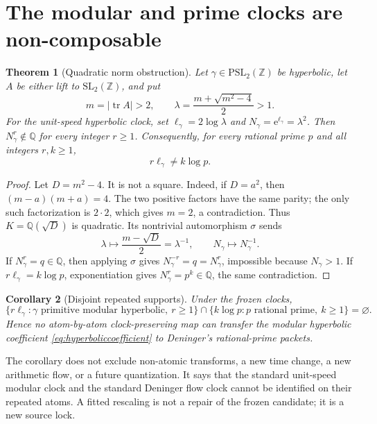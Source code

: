 \documentclass[11pt]{article}
\newtheorem{theorem}{Theorem}
\newtheorem{corollary}[theorem]{Corollary}
\theoremstyle{definition}
\theoremstyle{remark}
\newcommand{\Q}{\mathbb{Q}}
\newcommand{\Z}{\mathbb{Z}}
\newcommand{\e}{\mathrm{e}}
\begin{document}
\section{The modular and prime clocks are non-composable}
\label{sec:clock}

\begin{theorem}[Quadratic norm obstruction]
\label{thm:clock}
Let \(\gamma\in\mathrm{PSL}_2(\Z)\) be hyperbolic, let \(A\) be either lift
to \(\mathrm{SL}_2(\Z)\), and put
\[
 m=|\operatorname{tr}A|>2,\qquad
 \lambda=\frac{m+\sqrt{m^2-4}}{2}>1.
\]
For the unit-speed hyperbolic clock, set
\(\ell_\gamma=2\log\lambda\) and
\(N_\gamma=\e^{\ell_\gamma}=\lambda^2\).  Then
\(N_\gamma^r\notin\Q\) for every integer \(r\ge1\).  Consequently, for every
rational prime \(p\) and all integers \(r,k\ge1\),
\[
 r\ell_\gamma\ne k\log p.
\]
\end{theorem}

\begin{proof}
Let \(D=m^2-4\).  It is not a square.  Indeed, if \(D=a^2\), then
\((m-a)(m+a)=4\).  The two positive factors have the same parity; the only
such factorization is \(2\cdot2\), which gives \(m=2\), a contradiction.
Thus \(K=\Q(\sqrt D)\) is quadratic.  Its nontrivial automorphism \(\sigma\)
sends
\[
 \lambda\longmapsto\frac{m-\sqrt D}{2}=\lambda^{-1},
 \qquad N_\gamma\longmapsto N_\gamma^{-1}.
\]
If \(N_\gamma^r=q\in\Q\), then applying \(\sigma\) gives
\(N_\gamma^{-r}=q=N_\gamma^r\), impossible because \(N_\gamma>1\).  If
\(r\ell_\gamma=k\log p\), exponentiation gives
\(N_\gamma^r=p^k\in\Q\), the same contradiction.
\end{proof}

\begin{corollary}[Disjoint repeated supports]
\label{cor:support}
Under the frozen clocks,
\[
 \{r\ell_\gamma:\gamma\text{ primitive modular hyperbolic},\ r\ge1\}
 \cap\{k\log p:p\text{ rational prime},\ k\ge1\}=\varnothing.
\]
Hence no atom-by-atom clock-preserving map can transfer the modular
hyperbolic coefficient \eqref{eq:hyperboliccoefficient} to Deninger's
rational-prime packets.
\end{corollary}

The corollary does not exclude non-atomic transforms, a new time change, a new
arithmetic flow, or a future quantization.  It says that the standard
unit-speed modular clock and the standard Deninger flow clock cannot be
identified on their repeated atoms.  A fitted rescaling is not a repair of
the frozen candidate; it is a new source lock.
\end{document}
